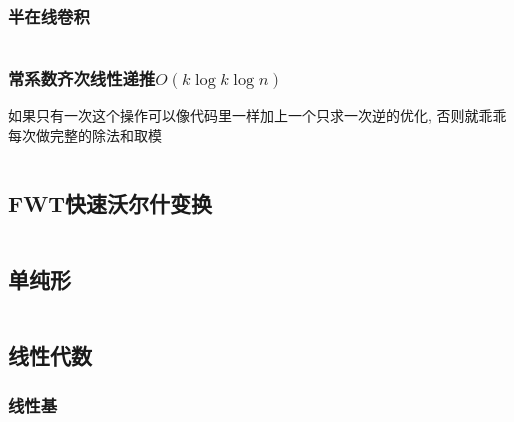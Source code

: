\documentclass[a4paper]{article}
\begin{document}
\begin{multicols}{2}
				\subsubsection{半在线卷积}
					\inputminted{cpp}{../src/math/半在线卷积.cpp}
				
				\subsubsection{常系数齐次线性递推$O(k\log k\log n)$}
					如果只有一次这个操作可以像代码里一样加上一个只求一次逆的优化, 否则就乖乖每次做完整的除法和取模
					\inputminted{cpp}{../src/math/常系数齐次线性递推.cpp}
				

			\subsection{FWT快速沃尔什变换}
				\inputminted{cpp}{../src/math/FWT.cpp}

			\subsection{单纯形}
				\inputminted{cpp}{../src/math/单纯形.cpp}



			\subsection{线性代数}






				\subsubsection{线性基}



\end{multicols}
\end{document}
